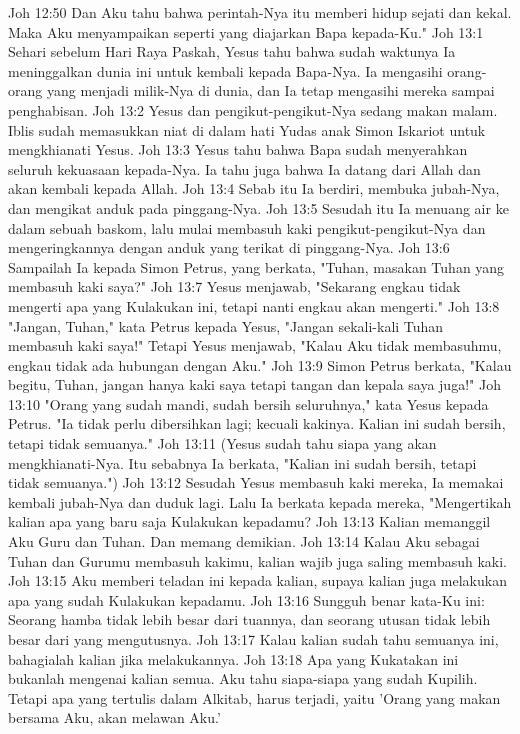Joh 12:50  Dan Aku tahu bahwa perintah-Nya itu memberi hidup sejati dan kekal. Maka Aku menyampaikan seperti yang diajarkan Bapa kepada-Ku."
Joh 13:1  Sehari sebelum Hari Raya Paskah, Yesus tahu bahwa sudah waktunya Ia meninggalkan dunia ini untuk kembali kepada Bapa-Nya. Ia mengasihi orang-orang yang menjadi milik-Nya di dunia, dan Ia tetap mengasihi mereka sampai penghabisan.
Joh 13:2  Yesus dan pengikut-pengikut-Nya sedang makan malam. Iblis sudah memasukkan niat di dalam hati Yudas anak Simon Iskariot untuk mengkhianati Yesus.
Joh 13:3  Yesus tahu bahwa Bapa sudah menyerahkan seluruh kekuasaan kepada-Nya. Ia tahu juga bahwa Ia datang dari Allah dan akan kembali kepada Allah.
Joh 13:4  Sebab itu Ia berdiri, membuka jubah-Nya, dan mengikat anduk pada pinggang-Nya.
Joh 13:5  Sesudah itu Ia menuang air ke dalam sebuah baskom, lalu mulai membasuh kaki pengikut-pengikut-Nya dan mengeringkannya dengan anduk yang terikat di pinggang-Nya.
Joh 13:6  Sampailah Ia kepada Simon Petrus, yang berkata, "Tuhan, masakan Tuhan yang membasuh kaki saya?"
Joh 13:7  Yesus menjawab, "Sekarang engkau tidak mengerti apa yang Kulakukan ini, tetapi nanti engkau akan mengerti."
Joh 13:8  "Jangan, Tuhan," kata Petrus kepada Yesus, "Jangan sekali-kali Tuhan membasuh kaki saya!" Tetapi Yesus menjawab, "Kalau Aku tidak membasuhmu, engkau tidak ada hubungan dengan Aku."
Joh 13:9  Simon Petrus berkata, "Kalau begitu, Tuhan, jangan hanya kaki saya tetapi tangan dan kepala saya juga!"
Joh 13:10  "Orang yang sudah mandi, sudah bersih seluruhnya," kata Yesus kepada Petrus. "Ia tidak perlu dibersihkan lagi; kecuali kakinya. Kalian ini sudah bersih, tetapi tidak semuanya."
Joh 13:11  (Yesus sudah tahu siapa yang akan mengkhianati-Nya. Itu sebabnya Ia berkata, "Kalian ini sudah bersih, tetapi tidak semuanya.")
Joh 13:12  Sesudah Yesus membasuh kaki mereka, Ia memakai kembali jubah-Nya dan duduk lagi. Lalu Ia berkata kepada mereka, "Mengertikah kalian apa yang baru saja Kulakukan kepadamu?
Joh 13:13  Kalian memanggil Aku Guru dan Tuhan. Dan memang demikian.
Joh 13:14  Kalau Aku sebagai Tuhan dan Gurumu membasuh kakimu, kalian wajib juga saling membasuh kaki.
Joh 13:15  Aku memberi teladan ini kepada kalian, supaya kalian juga melakukan apa yang sudah Kulakukan kepadamu.
Joh 13:16  Sungguh benar kata-Ku ini: Seorang hamba tidak lebih besar dari tuannya, dan seorang utusan tidak lebih besar dari yang mengutusnya.
Joh 13:17  Kalau kalian sudah tahu semuanya ini, bahagialah kalian jika melakukannya.
Joh 13:18  Apa yang Kukatakan ini bukanlah mengenai kalian semua. Aku tahu siapa-siapa yang sudah Kupilih. Tetapi apa yang tertulis dalam Alkitab, harus terjadi, yaitu 'Orang yang makan bersama Aku, akan melawan Aku.'
